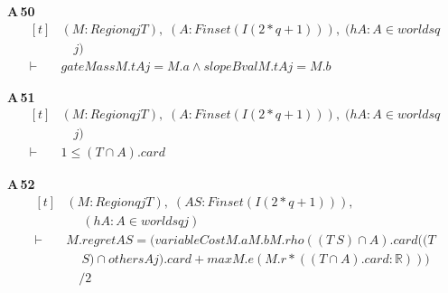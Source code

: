 \noindent\textbf{A\,50}\quad{}
{\footnotesize\[ \begin{aligned}[t]
&(\mathit{M} : \mathit{Region} \mathit{q} \mathit{j} \mathit{T}),\; (\mathit{A} : \mathit{Finset} (\mathit{I} (2*\mathit{q}+1))),\; (\mathit{hA} : \mathit{A} \in \mathit{worlds} \mathit{q}\\
&\quad \mathit{j})\\
\vdash\;&\mathit{gateMass} \mathit{M}.\mathit{t} \mathit{A} \mathit{j}=\mathit{M}.\mathit{a} \wedge \mathit{slopeBval} \mathit{M}.\mathit{t} \mathit{A} \mathit{j}=\mathit{M}.\mathit{b}
\end{aligned} \]}

\noindent\textbf{A\,51}\quad{}
{\footnotesize\[ \begin{aligned}[t]
&(\mathit{M} : \mathit{Region} \mathit{q} \mathit{j} \mathit{T}),\; (\mathit{A} : \mathit{Finset} (\mathit{I} (2*\mathit{q}+1))),\; (\mathit{hA} : \mathit{A} \in \mathit{worlds} \mathit{q}\\
&\quad \mathit{j})\\
\vdash\;&1 \leq (\mathit{T} \cap \mathit{A}).\mathit{card}
\end{aligned} \]}

\noindent\textbf{A\,52}\quad{}
{\footnotesize\[ \begin{aligned}[t]
&(\mathit{M} : \mathit{Region} \mathit{q} \mathit{j} \mathit{T}),\; (\mathit{A} \mathit{S} : \mathit{Finset} (\mathit{I} (2*\mathit{q}+1))),\\
&\quad \; (\mathit{hA} : \mathit{A} \in \mathit{worlds} \mathit{q} \mathit{j})\\
\vdash\;&\mathit{M}.\mathit{regret} \mathit{A} \mathit{S} = (\mathit{variableCost} \mathit{M}.\mathit{a} \mathit{M}.\mathit{b} \mathit{M}.\mathit{rho} ((\mathit{T} \ \mathit{S}) \cap \mathit{A}).\mathit{card} ((\mathit{T}\\
&\quad \ \mathit{S}) \cap \mathit{others} \mathit{A} \mathit{j}).\mathit{card}+\mathit{max} \mathit{M}.\mathit{e} (\mathit{M}.\mathit{r}*((\mathit{T} \cap \mathit{A}).\mathit{card}:\mathbb{R} )))\\
&\quad /2
\end{aligned} \]}

